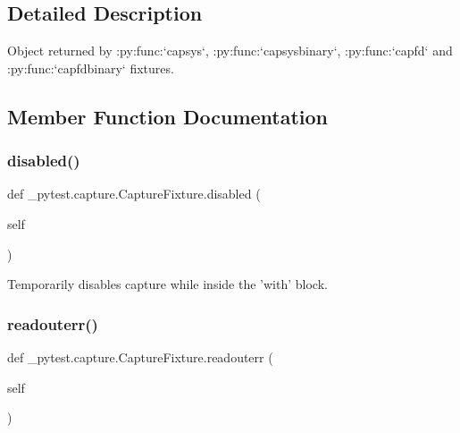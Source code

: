 \subsection{Detailed Description}
\begin{DoxyVerb}Object returned by :py:func:`capsys`, :py:func:`capsysbinary`, :py:func:`capfd` and :py:func:`capfdbinary`
fixtures.
\end{DoxyVerb}
 

\subsection{Member Function Documentation}
\mbox{\label{class__pytest_1_1capture_1_1_capture_fixture_abd27f778592b89220819fb1dbf93fa61}} 
\subsubsection{\texorpdfstring{disabled()}{disabled()}}
{\footnotesize\ttfamily def \+\_\+pytest.\+capture.\+Capture\+Fixture.\+disabled (\begin{DoxyParamCaption}\item[{}]{self }\end{DoxyParamCaption})}

\begin{DoxyVerb}Temporarily disables capture while inside the 'with' block.\end{DoxyVerb}
 \mbox{\label{class__pytest_1_1capture_1_1_capture_fixture_a1067f56196649f375e080bf9f65d3a33}} 
\subsubsection{\texorpdfstring{readouterr()}{readouterr()}}
{\footnotesize\ttfamily def \+\_\+pytest.\+capture.\+Capture\+Fixture.\+readouterr (\begin{DoxyParamCaption}\item[{}]{self }\end{DoxyParamCaption})}

